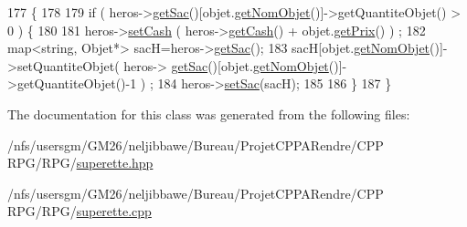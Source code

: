 \begin{DoxyCode}
177                                                            \{
178         
179         \textcolor{keywordflow}{if} ( heros->\hyperlink{class_heros_a62d8b172e82dbb0a1d2c23da21bdb069}{getSac}()[objet.\hyperlink{class_objet_a843e99ecd1e150589f8db23f43dd27b0}{getNomObjet}()]->getQuantiteObjet() > 0 ) \{
180         
181             heros->\hyperlink{class_heros_ae87dba7afa03e7fdacfc3a7e82d3a6a3}{setCash} ( heros->\hyperlink{class_heros_a77bdee21cb8c8356448bb6669941441c}{getCash}() + objet.\hyperlink{class_objet_a9b36c37091e821bc8f00d6bfd3665a66}{getPrix}() ) ;
182             map<string, Objet*> sacH=heros->\hyperlink{class_heros_a62d8b172e82dbb0a1d2c23da21bdb069}{getSac}();
183             sacH[objet.\hyperlink{class_objet_a843e99ecd1e150589f8db23f43dd27b0}{getNomObjet}()]->setQuantiteObjet( heros->
      \hyperlink{class_heros_a62d8b172e82dbb0a1d2c23da21bdb069}{getSac}()[objet.\hyperlink{class_objet_a843e99ecd1e150589f8db23f43dd27b0}{getNomObjet}()]->getQuantiteObjet()-1 ) ;
184             heros->\hyperlink{class_heros_a7d6d86388fe81deca1c5688ed07b2167}{setSac}(sacH);
185 
186         \}
187     \}
\end{DoxyCode}


The documentation for this class was generated from the following files\-:\begin{DoxyCompactItemize}
\item 
/nfs/usersgm/\-G\-M26/neljibbawe/\-Bureau/\-Projet\-C\-P\-P\-A\-Rendre/\-C\-P\-P R\-P\-G/\-R\-P\-G/\hyperlink{superette_8hpp}{superette.\-hpp}\item 
/nfs/usersgm/\-G\-M26/neljibbawe/\-Bureau/\-Projet\-C\-P\-P\-A\-Rendre/\-C\-P\-P R\-P\-G/\-R\-P\-G/\hyperlink{superette_8cpp}{superette.\-cpp}\end{DoxyCompactItemize}
